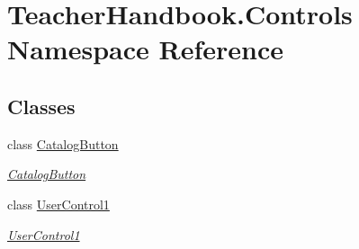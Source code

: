 \hypertarget{namespace_teacher_handbook_1_1_controls}{}\section{Teacher\+Handbook.\+Controls Namespace Reference}
\label{namespace_teacher_handbook_1_1_controls}
\subsection*{Classes}
\begin{DoxyCompactItemize}
\item 
class \mbox{\hyperlink{class_teacher_handbook_1_1_controls_1_1_catalog_button}{Catalog\+Button}}
\begin{DoxyCompactList}\small\item\em \mbox{\hyperlink{class_teacher_handbook_1_1_controls_1_1_catalog_button}{Catalog\+Button}} \end{DoxyCompactList}\item 
class \mbox{\hyperlink{class_teacher_handbook_1_1_controls_1_1_user_control1}{User\+Control1}}
\begin{DoxyCompactList}\small\item\em \mbox{\hyperlink{class_teacher_handbook_1_1_controls_1_1_user_control1}{User\+Control1}} \end{DoxyCompactList}\end{DoxyCompactItemize}
